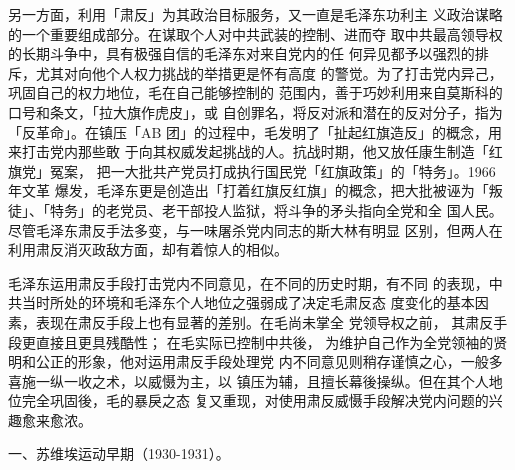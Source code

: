 另一方面，利用「肃反」为其政治目标服务，又一直是毛泽东功利主
义政治谋略的一个重要组成部分。在谋取个人对中共武装的控制、进而夺
取中共最高领导权的长期斗争中，具有极强自信的毛泽东对来自党内的任
何异见都予以强烈的排斥，尤其对向他个人权力挑战的举措更是怀有高度
的警觉。为了打击党内异己，巩固自己的权力地位，毛在自己能够控制的
范围内，善于巧妙利用来自莫斯科的口号和条文，「拉大旗作虎皮」，或
自创罪名，将反对派和潜在的反对分子，指为「反革命」。在镇压「AB
团」的过程中，毛发明了「扯起红旗造反」的概念，用来打击党内那些敢
于向其权威发起挑战的人。抗战时期，他又放任康生制造「红旗党」冤案，
把一大批共产党员打成执行国民党「红旗政策」的「特务」。1966 年文革
爆发，毛泽东更是创造出「打着红旗反红旗」的概念，把大批被诬为「叛
徒」、「特务」的老党员、老干部投人监狱，将斗争的矛头指向全党和全
国人民。尽管毛泽东肃反手法多变，与一味屠杀党内同志的斯大林有明显
区别，但两人在利用肃反消灭政敌方面，却有着惊人的相似。

毛泽东运用肃反手段打击党内不同意见，在不同的历史时期，有不同
的表现，中共当时所处的环境和毛泽东个人地位之强弱成了决定毛肃反态
度变化的基本因素，表现在肃反手段上也有显著的差别。在毛尚未掌全
党领导权之前，
其肃反手段更直接且更具残酷性；
在毛实际已控制中共後，
为维护自己作为全党领袖的贤明和公正的形象，他对运用肃反手段处理党
内不同意见则稍存谨慎之心，一般多喜施一纵一收之术，以威慑为主，以
镇压为辅，且擅长幕後操纵。但在其个人地位完全巩固後，毛的暴戾之态
复又重现，对使用肃反威慑手段解决党内问题的兴趣愈来愈浓。

一、苏维埃运动早期（1930-1931）。

